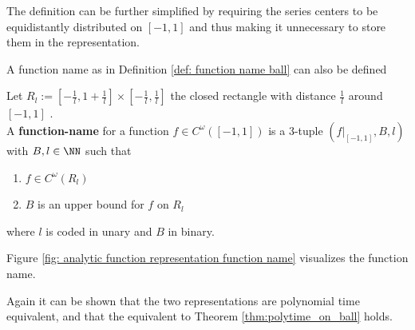 	The definition can be further simplified by requiring the series centers to be equidistantly distributed on $[-1,1]$ and thus
	making it unnecessary to store them in the representation.

	A function name as in Definition \ref{def: function name ball} can also be defined
	\begin{definition}
		Let $R_l := [-\frac{1}{l}, 1+\frac{1}{l}] \times [-\frac{1}{l}, \frac{1}{l}]$ the closed rectangle with distance $\frac{1}{l}$ around $[-1,1]$ .\\
		A \textbf{function-name} for a function $f \in C^\omega([-1,1])$ is a 3-tuple $(f|_{[-1,1]}, B, l)$ with $B, l \in \NN$ such that 
		\begin{enumerate}
			\item $f \in C^\omega(R_l)$
			\item $B$ is an upper bound for $f$ on $R_l$
		\end{enumerate}
		where $l$ is coded in unary and $B$ in binary.
	\end{definition}
	Figure \ref{fig: analytic function representation function name} visualizes the function name. 

	Again it can be shown that the two representations are polynomial time equivalent, and that the equivalent to
	Theorem \ref{thm:polytime_on_ball} holds.
